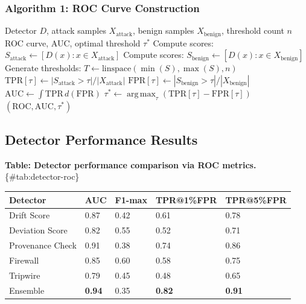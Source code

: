 \documentclass[
]{article}
\newcounter{none} %
\DeclareMathOperator*{\argmax}{arg\,max}
\begin{document}
\subsubsection{Algorithm 1: ROC Curve
Construction}\label{algorithm-1-roc-curve-construction}

\begin{algorithm}
\caption{ROC Curve Construction}
\label{alg:roc-construction}
\begin{algorithmic}[1]
\Require Detector $D$, attack samples $X_{\text{attack}}$, benign samples $X_{\text{benign}}$, threshold count $n$
\Ensure ROC curve, AUC, optimal threshold $\tau^*$
\State Compute scores: $S_{\text{attack}} \gets [D(x) : x \in X_{\text{attack}}]$
\State Compute scores: $S_{\text{benign}} \gets [D(x) : x \in X_{\text{benign}}]$
\State Generate thresholds: $T \gets \text{linspace}(\min(S), \max(S), n)$
    \State $\text{TPR}[\tau] \gets |S_{\text{attack}} > \tau| / |X_{\text{attack}}|$
    \State $\text{FPR}[\tau] \gets |S_{\text{benign}} > \tau| / |X_{\text{benign}}|$
\EndFor
\State $\text{AUC} \gets \int \text{TPR} \, d(\text{FPR})$ 
\State $\tau^* \gets \argmax_\tau (\text{TPR}[\tau] - \text{FPR}[\tau])$ 
\State \Return $(\text{ROC}, \text{AUC}, \tau^*)$
\end{algorithmic}
\end{algorithm}

\subsection{Detector Performance
Results}\label{detector-performance-results}

\textbf{Table: Detector performance comparison via ROC metrics.}
\{\#tab:detector-roc\}

{\def\LTcaptype{none} %
\begin{longtable}[]{@{}lllll@{}}
\toprule\noalign{}
Detector & AUC & F1-max \(\tau) & TPR@1\%FPR & TPR@5\%FPR \\
\midrule\noalign{}
\endhead
\bottomrule\noalign{}
\endlastfoot
Drift Score & 0.87 & 0.42 & 0.61 & 0.78 \\
Deviation Score & 0.82 & 0.55 & 0.52 & 0.71 \\
Provenance Check & 0.91 & 0.38 & 0.74 & 0.86 \\
Firewall & 0.85 & 0.60 & 0.58 & 0.75 \\
Tripwire & 0.79 & 0.45 & 0.48 & 0.65 \\
Ensemble & \textbf{0.94} & 0.35 & \textbf{0.82} & \textbf{0.91} \\
\end{longtable}
}
\end{document}
